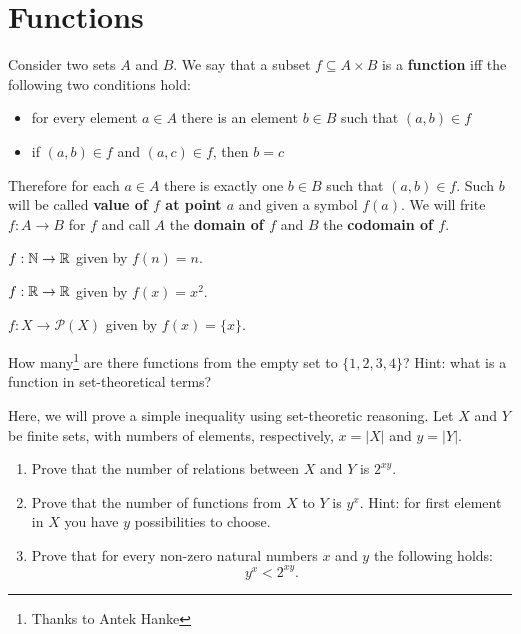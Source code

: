 \section{Functions}
\label{sec:intro_to_functions}

\begin{definition}
  Consider two sets $A$ and $B$. We say that a subset $f\subseteq A\times B$ is a \textbf{function}
  iff the following two conditions hold:
  \begin{itemize}
    \item for every element $a\in A$ there is an element $b\in B$ such that $(a,b)\in f$
    \item if $(a,b)\in f$ and $(a,c)\in f$, then $b=c$
  \end{itemize}
  Therefore for each $a\in A$ there is exactly one $b\in B$ such that $(a,b)\in f$. Such $b$ will be called \textbf{value of $f$ at point $a$} and given a symbol $f(a).$
  We will frite $f: A\to B$ for $f$ and call $A$ the \textbf{domain of $f$} and $B$ the \textbf{codomain of $f$}.
\end{definition}

\begin{example}
  $f: \mathbb N\to \mathbb R$ given by $f(n)=n$.
\end{example}

\begin{example}
  $f: \mathbb R\to \mathbb R$ given by $f(x)=x^2$.
\end{example}

\begin{example}
  $f: X\to \mathcal P(X)$ given by $f(x)=\{x\}$.
\end{example}

\begin{prob}
	How many\footnote{Thanks to Antek Hanke} are there functions from the empty set to $\{1,2,3,4\}$? Hint: what is a function in set-theoretical terms?
\end{prob}

\begin{exercise}
  Here, we will prove a simple inequality using set-theoretic reasoning. Let $X$ and $Y$ be finite sets, with numbers of elements, respectively, $x=|X|$ and $y=|Y|$.
  \begin{enumerate}
    \item Prove that the number of relations between $X$ and $Y$ is $2^{xy}$.
    \item Prove that the number of functions from $X$ to $Y$ is $y^x$. Hint: for first element in $X$ you have $y$ possibilities to choose.
    \item Prove that for every non-zero natural numbers $x$ and $y$ the following holds:
      $$y^x<2^{xy}.$$
  \end{enumerate}
\end{exercise}

